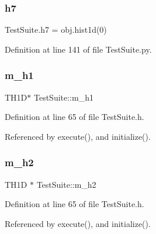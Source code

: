 \mbox{\label{classTestSuite_a64192d2fc98e5040f3156e460d23d8ac}} 
\subsubsection{\texorpdfstring{h7}{h7}}
{\footnotesize\ttfamily Test\+Suite.\+h7 = obj.\+hist1d(0)}



Definition at line 141 of file Test\+Suite.\+py.

\mbox{\label{classTestSuite_a8691ed6da0262d0e09d512b58375f94c}} 
\subsubsection{\texorpdfstring{m\+\_\+h1}{m\_h1}}
{\footnotesize\ttfamily T\+H1D$\ast$ Test\+Suite\+::m\+\_\+h1\hspace{0.3cm}{\ttfamily [private]}}



Definition at line 65 of file Test\+Suite.\+h.



Referenced by execute(), and initialize().

\mbox{\label{classTestSuite_ad08c4828466d73e1273408ecd3547baf}} 
\subsubsection{\texorpdfstring{m\+\_\+h2}{m\_h2}}
{\footnotesize\ttfamily T\+H1D $\ast$ Test\+Suite\+::m\+\_\+h2\hspace{0.3cm}{\ttfamily [private]}}



Definition at line 65 of file Test\+Suite.\+h.



Referenced by execute(), and initialize().

\mbox{\label{classTestSuite_a86ca996cbb37caad3bcc32a138737e27}} 
